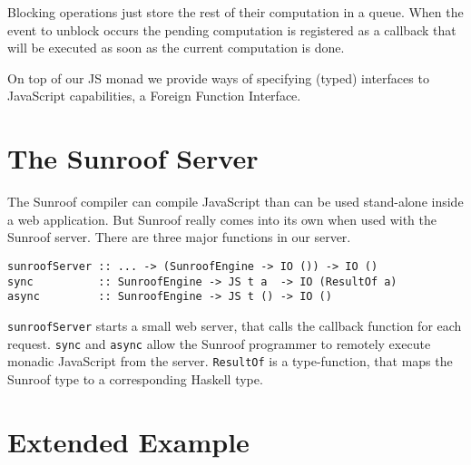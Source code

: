 \documentclass{llncs}
\newcommand{\Src}[1]{{\tt{#1}}}
\begin{document}
Blocking operations just store the rest of their computation in a queue.
When the event to unblock occurs the pending computation is registered 
as a callback that will be executed as soon as the current computation
is done.

On top of our JS monad we provide ways of specifying (typed)
interfaces to JavaScript capabilities, a Foreign Function Interface.

\section{The Sunroof Server}

The Sunroof compiler can compile JavaScript than can be used
stand-alone inside a web application. But Sunroof really comes
into its own when used with the Sunroof server. There
are three major functions in our server.

\begin{verbatim}
sunroofServer :: ... -> (SunroofEngine -> IO ()) -> IO ()
sync          :: SunroofEngine -> JS t a  -> IO (ResultOf a)
async         :: SunroofEngine -> JS t () -> IO ()
\end{verbatim}        

\Src{sunroofServer} starts a small web server,
that calls the callback function for each request.
\Src{sync} and \Src{async} allow the Sunroof programmer
to remotely execute monadic JavaScript from the server.
\Src{ResultOf} is a type-function, that maps the 
Sunroof type to a corresponding Haskell type.

\section{Extended Example}


%
%



\end{document}
